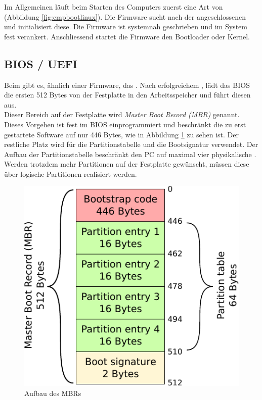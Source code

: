 Im Allgemeinen läuft beim Starten des Computers zuerst eine Art von  (Abbildung \ref{fig:cmpbootlinux}). 
Die Firmware sucht nach der angeschlossenen  und initialisiert diese. 
Die Firmware ist systemnah geschrieben und im System fest verankert. Anschliessend startet die 
Firmware den Bootloader oder Kernel.

\subsection{BIOS / UEFI}

Beim  gibt es, ähnlich einer Firmware, das 
. Nach erfolgreichem ,
lädt das BIOS die ersten 512 Bytes von der Festplatte in den Arbeitsspeicher und führt diesen aus. \\

Dieser Bereich auf der Festplatte wird \emph{Master Boot Record (MBR)} genannt.
Dieses Vorgehen ist fest im BIOS einprogrammiert und beschränkt die zu erst gestartete Software auf nur 446 Bytes,
wie in Abbildung \ref{fig:mbr} zu sehen ist. Der restliche Platz wird für die Partitionstabelle und die Bootsignatur
verwendet. Der Aufbau der Partitionstabelle beschränkt den PC auf maximal vier physikalische . 
Werden trotzdem mehr Partitionen auf der Festplatte gewünscht, müssen diese über logische Partitionen realisiert werden.  \\

\begin{figure}
   \begin{center}
      \vspace{-0.5cm}
      \includegraphics{images/mbr}
   \end{center}
   \caption{Aufbau des MBRs}
   \label{fig:mbr}
\end{figure}


